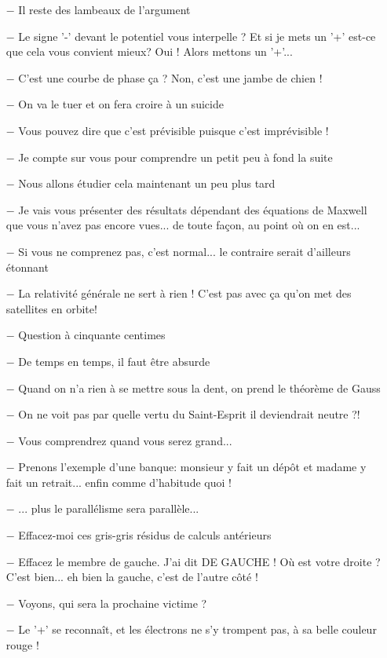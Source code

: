 \begin{itemize}	 
	\item[$-$] Il reste des lambeaux de l'argument
	\item[$-$] Le signe '-' devant le potentiel vous interpelle ? Et si je mets un '+' est-ce que cela vous convient mieux? Oui ! Alors mettons un '+'...
	\item[$-$] C'est une courbe de phase ça ? Non, c'est une jambe de chien !
	\item[$-$] On va le tuer et on fera croire à un suicide
	\item[$-$] Vous pouvez dire que c'est prévisible puisque c'est imprévisible !
	\item[$-$] Je compte sur vous pour comprendre un petit peu à fond la suite
	\item[$-$] Nous allons étudier cela maintenant un peu plus tard
	\item[$-$] Je vais vous présenter des résultats dépendant des équations de Maxwell que vous n'avez pas encore vues... de toute façon, au point où on en est...
	\item[$-$] Si vous ne comprenez pas, c'est normal... le contraire serait d'ailleurs étonnant
	\item[$-$] La relativité générale ne sert à rien ! C'est pas avec ça qu'on met des satellites en orbite!
	\item[$-$] Question à cinquante centimes
	\item[$-$] De temps en temps, il faut être absurde
	\item[$-$] Quand on n'a rien à se mettre sous la dent, on prend le théorème de Gauss
	\item[$-$] On ne voit pas par quelle vertu du Saint-Esprit il deviendrait neutre ?!
	\item[$-$] Vous comprendrez quand vous serez grand...
	\item[$-$] Prenons l'exemple d'une banque: monsieur y fait un dépôt et madame y fait un retrait... enfin comme d'habitude quoi !
	\item[$-$] ... plus le parallélisme sera parallèle...
	\item[$-$] Effacez-moi ces gris-gris résidus de calculs antérieurs
	\item[$-$] Effacez le membre de gauche. J'ai dit DE GAUCHE ! Où est votre droite ? C'est bien... eh bien la gauche, c'est de l'autre côté !
	\item[$-$] Voyons, qui sera la prochaine victime ?
	\item[$-$] Le '+' se reconnaît, et les électrons ne s'y trompent pas, à sa belle couleur rouge !

\end{itemize}
